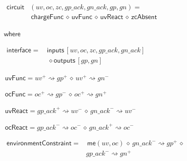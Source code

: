 \documentclass[british,compsoc]{IEEEtran}
\begin{document}
\begin{minipage}[h]{1\columnwidth}%

\begin{flushleft}
$\begin{aligned}\mathsf{circuit}&(uv, oc, zc, gp\_ack, gn\_ack, gp, gn)= \\
& \,\mathsf{chargeFunc}\,\diamond\,\mathsf{uvFunc}\,\diamond\,\mathsf{uvReact}\,\diamond
\,\mathsf{zcAbsent}
\end{aligned}
$
\par\end{flushleft}%

\par\begin{flushleft}
$\mathsf{where}$
\par\end{flushleft}

\begin{flushleft}
$\begin{aligned}\mathsf{interface}=\,&\mathsf{inputs}\,[uv, oc, zc, gp\_ack, gn\_ack]\\
& \,\diamond \mathsf{outputs}\,[gp, gn]
\end{aligned}$
\par\end{flushleft}%

\begin{flushleft}
$\,\mathsf{uvFunc}=uv^{+}\rightsquigarrow gp^{+}\,\diamond\, uv^{+}\rightsquigarrow gn^{-}$
\par\end{flushleft}

\begin{flushleft}
$\,\mathsf{ocFunc}=oc^{+}\rightsquigarrow gp^{-}\,\diamond\, oc^{+}\rightsquigarrow gn^{+}$
\par\end{flushleft}

\begin{flushleft}
$\,\mathsf{uvReact}=gp\_ack^{+}\rightsquigarrow uv^{-}\,\diamond\, gn\_ack^{-}\rightsquigarrow uv^{-}$
\par\end{flushleft}

\begin{flushleft}
$\,\mathsf{ocReact}=gp\_ack^{-}\rightsquigarrow oc^{-}\,\diamond\, gn\_ack^{+}\rightsquigarrow oc^{-}$
\par\end{flushleft}

\begin{flushleft}
$\begin{aligned}\mathsf{environmentConstraint}=&\,\mathsf{me}(uv, oc) \,\diamond\, gn\_ack^{-}\rightsquigarrow gp^{+}\,\diamond\,\\
& gp\_ack^{-}\rightsquigarrow gn^{+}
\end{aligned}$
\par\end{flushleft}


\end{minipage}
\end{document}
